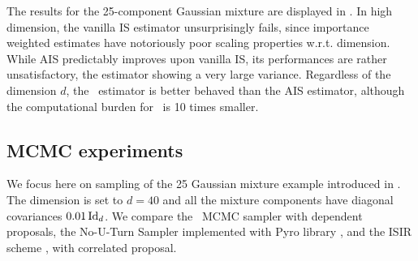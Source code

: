 \documentclass{article}
\begin{document}
The results for the 25-component Gaussian mixture are displayed in . In high dimension, the vanilla IS estimator unsurprisingly fails, since importance weighted estimates have notoriously poor scaling properties w.r.t. dimension. While AIS predictably improves upon vanilla IS, its performances are rather unsatisfactory, the estimator showing a very large variance. Regardless of the dimension $d$, the \IFIS\ estimator  is better behaved than the AIS estimator, although the computational burden for \IFIS\ is 10 times smaller.

\subsection{MCMC experiments}
\label{subsec:mcmc_exp}
We focus here on sampling of the 25 Gaussian mixture example introduced in . The dimension is set to $d=40$  and all the mixture components have diagonal covariances  $0.01 \operatorname{Id}_d$.
We compare the \InFiNE\ MCMC sampler with dependent proposals,
the No-U-Turn Sampler implemented with Pyro library \cite{bingham2019pyro},
and the ISIR scheme \cite{andrieu2010particle, andrieu2018uniform}, with correlated proposal.
\end{document}

